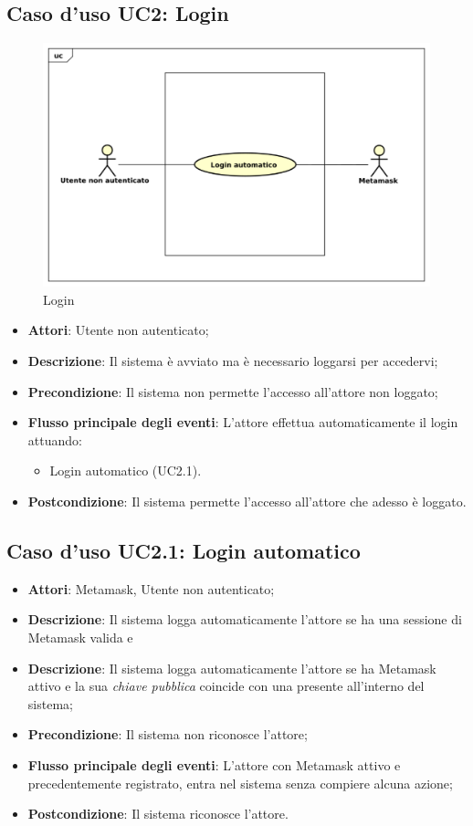 \subsection{Caso d'uso \texorpdfstring{UC2}{UC2}: Login}
\begin{figure} [H]
	\centering
	\includegraphics[scale=0.45]{./img/UC2.pdf}
	\caption{Login}\label{}
\end{figure}
\begin{itemize}
	\item \textbf{Attori}: Utente non autenticato;
	\item \textbf{Descrizione}: Il sistema è avviato ma è necessario loggarsi per accedervi;
	\item \textbf{Precondizione}: Il sistema non permette l'accesso all'attore non loggato;
	\item \textbf{Flusso principale degli eventi}: L'attore effettua automaticamente il login attuando:
	\begin{itemize}
		\item Login automatico (UC2.1).
	\end{itemize}
	\item \textbf{Postcondizione}: Il sistema permette l'accesso all'attore che adesso è loggato.
\end{itemize}
\subsection{Caso d'uso \texorpdfstring{UC2.1}{UC2.1}: Login automatico}
\begin{itemize}
	\item \textbf{Attori}: Metamask, Utente non autenticato;
	\item \textbf{Descrizione}: Il sistema logga automaticamente l'attore se ha una sessione di Metamask valida e 
	\item \textbf{Descrizione}: Il sistema logga automaticamente l'attore se ha Metamask attivo e la sua \emph{chiave pubblica} coincide con una presente all'interno del sistema;
	\item \textbf{Precondizione}: Il sistema non riconosce l'attore;
	\item \textbf{Flusso principale degli eventi}: L'attore con Metamask attivo e precedentemente registrato, entra nel sistema senza compiere alcuna azione;
	\item \textbf{Postcondizione}: Il sistema riconosce l'attore.
\end{itemize}
